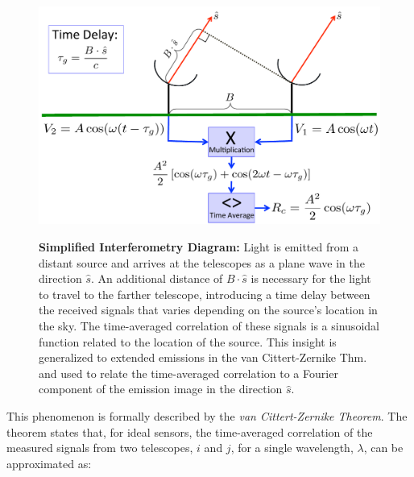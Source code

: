 \begin{figure}[tb!]
	\centering
	{\includegraphics[width=\linewidth]
		{interferometryfig.pdf}}
	\caption{ \footnotesize{{\bf Simplified Interferometry Diagram:} 
			Light is emitted from a distant source and arrives at the telescopes as a plane wave in the direction $\hat{s}$. An additional distance of $B \cdot \hat{s}$ is necessary for the light to travel to the farther telescope, introducing  a time delay between the received signals that varies depending on the source's location in the sky. The time-averaged correlation of these signals is a sinusoidal function related to the location of the source. This insight is generalized to extended emissions in the van Cittert-Zernike Thm. and used to relate the time-averaged correlation to a Fourier component of the emission image in the direction $\hat{s}$.
			}}
	\label{fig:introinterferometry}
\end{figure}


This phenomenon is formally described by the \textit{van Cittert-Zernike Theorem}. The theorem states that, for ideal sensors, the time-averaged correlation of the measured signals from two telescopes, $i$ and $j$, 
for a single wavelength, $\lambda$, can be approximated as:

